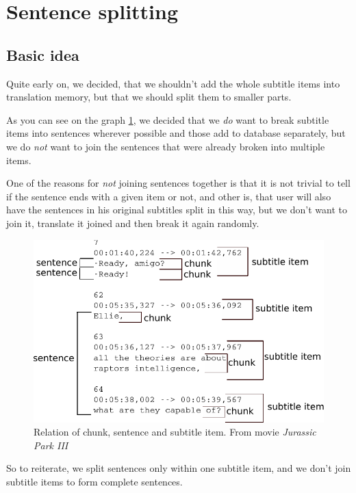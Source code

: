 \section{Sentence splitting}
\subsection*{Basic idea}
Quite early on, we decided, that we shouldn't add the whole subtitle items into translation memory, but that we should split them to smaller parts.

As you can see on the graph \ref{splitting:chunks}, we decided that we \emph{do} want to break subtitle items into sentences wherever possible and those add to database separately, but we do \emph{not} want to join the sentences that were already broken into multiple items.

One of the reasons for \emph{not} joining sentences together is that it is not trivial to tell if the sentence ends with a given item or not, and other is, that user will also have the sentences in his original subtitles split in this way, but we don't want to join it, translate it joined and then break it again randomly.

\begin{figure}[h]
\begin{center}
\includegraphics{figures/chunks.pdf}
\end{center}
\caption{Relation of chunk, sentence and subtitle item. From movie \emph{Jurassic Park III}}\label{splitting:chunks}
\end{figure}

So to reiterate, we split sentences only within one subtitle item, and we don't join subtitle items to form complete sentences.

